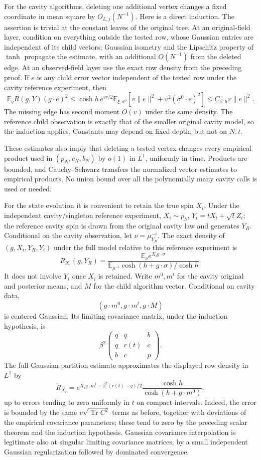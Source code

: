 \documentclass[11pt,reqno]{amsart}
\begin{document}
For the cavity algorithms, deleting one additional vertex changes a
fixed coordinate in mean square by $O_{L,j}(N^{-1})$.
Here is a direct induction. The assertion is trivial at the constant
leaves of the original tree.  At an original-field layer, condition on
everything outside the tested row, whose Gaussian entries are independent
of its child vectors; Gaussian isometry and the Lipschitz property of $\tanh$ propagate
the estimate, with an additional $O(N^{-1})$ from the deleted edge.
At an observed-field layer use the exact row density from the preceding
proof.  If $e$ is any child error vector independent of the tested row
under the cavity reference experiment, then
\[
 \mathbb E_g R(g,Y)(g\cdot e)^2
 \le \cosh h\,e^{vr/2}
       \mathbb E_{\xi,\sigma^0}
          \left[v\|e\|^2+v^2(\sigma^0\cdot e)^2\right]
 \le C_{\beta,h}v\|e\|^2.
\]
The missing edge has second moment $O(v)$ under the same density.
The reference child observation is exactly that of the smaller original
cavity model, so the induction applies. Constants may depend on fixed
depth, but not on $N,t$.

These estimates also imply that deleting a tested vertex changes every
empirical product used in $(p_N,c_N,b_N)$ by $o(1)$ in $L^1$, uniformly in
time. Products are bounded, and Cauchy--Schwarz transfers the normalized
vector estimates to empirical products. No union bound over all the
polynomially many cavity calls is used or needed.

For the state evolution it is convenient to retain the true spin $X_i$.
Under the independent cavity/singleton reference experiment,
$X_i\sim p_h$, $Y_i=tX_i+\sqrt t Z_i$; the reference cavity spin is drawn
from the original cavity law and generates $Y_R$.
Conditional on the cavity observation, let $\nu=\mu^{-i}_{Y_R}$.
The exact density of $(g,X_i,Y_R,Y_i)$ under the full model relative to
this reference experiment is
\[
 R_{X_i}(g,Y_R)=
 \frac{\mathbb E_\nu e^{X_i g\cdot\sigma}}
 {\mathbb E_{\mu^{-i}}\cosh(h+g\cdot\sigma)/\cosh h}.
\]
It does not involve $Y_i$ once $X_i$ is retained.
Write $m^0,m^t$ for the cavity original and posterior means, and $M$ for
the child algorithm vector.  Conditional on cavity data,
\[
 (g\cdot m^0,g\cdot m^t,g\cdot M)
\]
is centered Gaussian. Its limiting covariance matrix, under the induction
hypothesis, is
\[
 \beta^2
 \begin{pmatrix}
 q&q&b\\q&r(t)&c\\b&c&p
 \end{pmatrix}.
\]
The full Gaussian partition estimate approximates the displayed row
density in $L^1$ by
\[
 \widetilde R_{X_i}
 =e^{X_i g\cdot m^t-\beta^2(r(t)-q)/2}
       \frac{\cosh h}{\cosh(h+g\cdot m^0)},
\]
up to errors tending to zero uniformly in $t$ on compact intervals.
Indeed, the error is bounded by the same $v\sqrt{\operatorname{Tr}C^2}$
terms as before, together with deviations of the empirical covariance
parameters; these tend to zero by the preceding scalar theorem and the
induction hypothesis. Gaussian covariance interpolation is legitimate
also at singular limiting covariance matrices, by a small independent
Gaussian regularization followed by dominated convergence.
\end{document}
